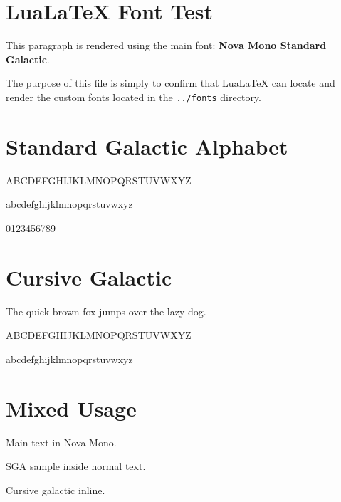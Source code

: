 \documentclass[12pt]{article}
\begin{document}
\section*{LuaLaTeX Font Test}

This paragraph is rendered using the main font:
\textbf{Nova Mono Standard Galactic}.

The purpose of this file is simply to confirm that LuaLaTeX can locate
and render the custom fonts located in the \texttt{../fonts} directory.

\bigskip

\section*{Standard Galactic Alphabet}

{\sga
ABCDEFGHIJKLMNOPQRSTUVWXYZ

abcdefghijklmnopqrstuvwxyz

0123456789
}

\bigskip

\section*{Cursive Galactic}

{\cursivegalactic
The quick brown fox jumps over the lazy dog.

ABCDEFGHIJKLMNOPQRSTUVWXYZ

abcdefghijklmnopqrstuvwxyz
}

\bigskip

\section*{Mixed Usage}

Main text in Nova Mono.

{\sga SGA sample inside normal text.}

{\cursivegalactic Cursive galactic inline.}
\end{document}
